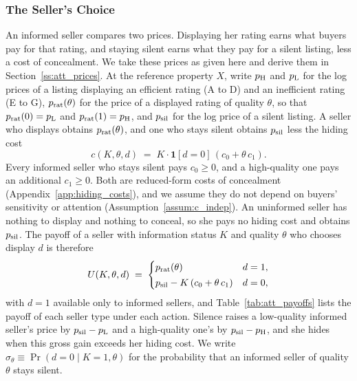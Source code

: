\subsubsection{The Seller's Choice}
\label{ss:att_seller}

An informed seller compares two prices. Displaying her rating earns what buyers pay for that rating, and staying silent earns what they pay for a silent listing, less a cost of concealment. We take these prices as given here and derive them in Section~\ref{ss:att_prices}. At the reference property $X$, write $p_{\rm H}$ and $p_{\rm L}$ for the log prices of a listing displaying an efficient rating (A to D) and an inefficient rating (E to G), $p_{\rm rat}(\theta)$ for the price of a displayed rating of quality $\theta$, so that $p_{\rm rat}(0)=p_{\rm L}$ and $p_{\rm rat}(1)=p_{\rm H}$, and $p_{\rm sil}$ for the log price of a silent listing. A seller who displays obtains $p_{\rm rat}(\theta)$, and one who stays silent obtains $p_{\rm sil}$ less the hiding cost
\begin{equation}
    c(K,\theta,d)\;=\;K\cdot\mathbf 1[d=0]\,(c_0+\theta\,c_1).
    \label{eq:hiding_cost}
\end{equation}
Every informed seller who stays silent pays $c_0\ge0$, and a high-quality one pays an additional $c_1\ge0$. Both are reduced-form costs of concealment (Appendix~\ref{app:hiding_costs}), and we assume they do not depend on buyers' sensitivity or attention (Assumption~\ref{assum:c_indep}). An uninformed seller has nothing to display and nothing to conceal, so she pays no hiding cost and obtains $p_{\rm sil}$. The payoff of a seller with information status $K$ and quality $\theta$ who chooses display $d$ is therefore
\begin{equation}
    U(K,\theta,d)\;=\;
    \begin{cases}
        p_{\rm rat}(\theta) & d=1,\\[2pt]
        p_{\rm sil}-K\,(c_0+\theta\,c_1) & d=0,
    \end{cases}
    \label{eq:seller_payoff}
\end{equation}
with $d=1$ available only to informed sellers, and Table~\ref{tab:att_payoffs} lists the payoff of each seller type under each action. Silence raises a low-quality informed seller's price by $p_{\rm sil}-p_{\rm L}$ and a high-quality one's by $p_{\rm sil}-p_{\rm H}$, and she hides when this gross gain exceeds her hiding cost. We write $\sigma_\theta\equiv\Pr(d=0\mid K=1,\theta)$ for the probability that an informed seller of quality $\theta$ stays silent.

